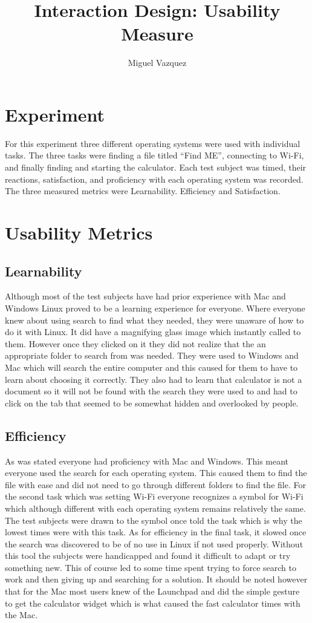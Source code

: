 \documentclass[11pt]{article}
\title{Interaction Design: Usability Measure}
\author{Miguel Vazquez}
\begin{document}
\maketitle
\tableofcontents

\section{Experiment}
For this experiment three different operating systems were used with individual tasks. The three tasks were finding a file titled “Find ME”, connecting to Wi-Fi, and finally finding and starting the calculator. Each test subject was timed, their reactions, satisfaction, and proficiency with each operating system was recorded. The three measured metrics were Learnability. Efficiency and Satisfaction.
\section{Usability Metrics}

\subsection{Learnability}
Although most of the test subjects have had prior experience with Mac and Windows Linux proved to be a learning experience for everyone. Where everyone knew about using search to find what they needed, they were unaware of how to do it with Linux. It did have a magnifying glass image which instantly called to them. However once they clicked on it they did not realize that the an appropriate folder to search from was needed. They were used to Windows and Mac which will search the entire computer and this caused for them to have to learn about choosing it correctly. They also had to learn that calculator is not a document so it will not be found with the search they were used to and had to click on the tab that seemed to be somewhat hidden and overlooked by people.

\subsection{Efficiency}
As was stated everyone had proficiency with Mac and Windows. This meant everyone used the search for each operating system. This caused them to find the file with ease and did not need to go through different folders to find the file. For the second task which was setting Wi-Fi everyone recognizes a symbol for Wi-Fi which although different with each operating system remains relatively the same. The test subjects were drawn to the symbol once told the task which is why the lowest times were with this task. As for efficiency in the final task, it slowed once the search was discovered to be of no use in Linux if not used properly. Without this tool the subjects were handicapped and found it difficult to adapt or try something new. This of course led to some time spent trying to force search to work and then giving up and searching for a solution. It should be noted however that for the Mac most users knew of the Launchpad and did the simple gesture to get the calculator widget which is what caused the fast calculator times with the Mac.
\end{document}
